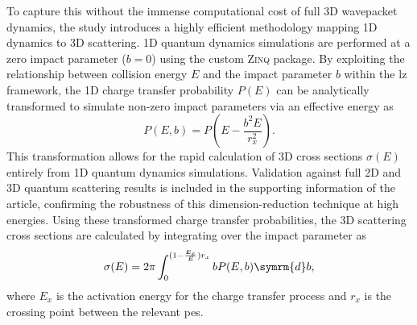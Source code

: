 To capture this without the immense computational cost of full 3D wavepacket dynamics, the study introduces a highly efficient methodology mapping 1D dynamics to 3D scattering. 1D quantum dynamics simulations are performed at a zero impact parameter ($b=0$) using the custom \textsc{Zinq} package. By exploiting the relationship between collision energy $E$ and the impact parameter $b$ within the \acrshort{lz} framework, the 1D charge transfer probability $P(E)$ can be analytically transformed to simulate non-zero impact parameters via an effective energy as
\begin{equation}
P(E,b)=P\left(E-\frac{b^2E}{r_x^2}\right).
\end{equation}
This transformation allows for the rapid calculation of 3D cross sections $\sigma(E)$ entirely from 1D quantum dynamics simulations. Validation against full 2D and 3D quantum scattering results is included in the supporting information of the article, confirming the robustness of this dimension-reduction technique at high energies. Using these transformed charge transfer probabilities, the 3D scattering cross sections are calculated by integrating over the impact parameter as
\begin{equation}
\sigma(E)=2\pi\int_0^{(1-\frac{E_x}{E})r_x}bP(E,b)\symrm{d}b,
\end{equation}
where $E_x$ is the activation energy for the charge transfer process and $r_x$ is the crossing point between the relevant \acrshort{pes}.
